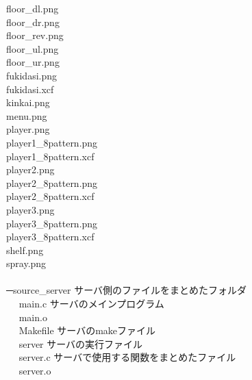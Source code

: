 \documentclass{jarticle}
\begin{document}
\hspace{3em}    floor\_dl.png \\
\hspace{3em}    floor\_dr.png \\
\hspace{3em}    floor\_rev.png \\
\hspace{3em}    floor\_ul.png \\
\hspace{3em}    floor\_ur.png \\
\hspace{3em}    fukidasi.png \\
\hspace{3em}    fukidasi.xcf \\
\hspace{3em}    kinkai.png \\
\hspace{3em}    menu.png \\
\hspace{3em}    player.png \\
\hspace{3em}    player1\_8pattern.png \\
\hspace{3em}    player1\_8pattern.xcf \\
\hspace{3em}    player2.png \\
\hspace{3em}    player2\_8pattern.png \\
\hspace{3em}    player2\_8pattern.xcf \\
\hspace{3em}    player3.png \\
\hspace{3em}    player3\_8pattern.png \\
\hspace{3em}    player3\_8pattern.xcf \\
\hspace{3em}    shelf.png \\
\hspace{3em}    spray.png \\
 \\
─source\_server サーバ側のファイルをまとめたフォルダ \\
\hspace{3em}    　  main.c サーバのメインプログラム \\
 \hspace{3em}   　  main.o \\
 \hspace{3em}   　  Makefile サーバのmakeファイル \\
 \hspace{3em}   　  server サーバの実行ファイル \\
 \hspace{3em}   　  server.c サーバで使用する関数をまとめたファイル \\
 \hspace{3em}   　  server.o \\
\end{document}
